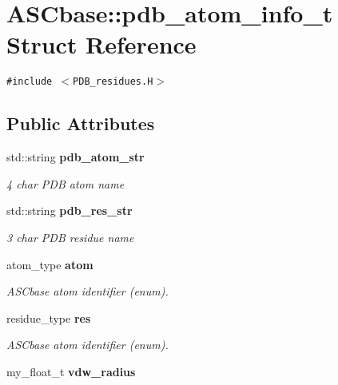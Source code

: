 \section{ASCbase::pdb\_\-atom\_\-info\_\-t Struct Reference}
\label{structASCbase_1_1pdb__atom__info__t}
{\tt \#include $<$PDB\_\-residues.H$>$}

\subsection*{Public Attributes}
\begin{CompactItemize}
\item 
std::string \bf{pdb\_\-atom\_\-str}\label{structASCbase_1_1pdb__atom__info__t_5c36c5c8f4e3e90d5cd92dc4aacb5256}

\begin{CompactList}\small\item\em 4 char PDB atom name \item\end{CompactList}\item 
std::string \bf{pdb\_\-res\_\-str}\label{structASCbase_1_1pdb__atom__info__t_9b3d5dd5a58707f7df56b34ccd3001dd}

\begin{CompactList}\small\item\em 3 char PDB residue name \item\end{CompactList}\item 
atom\_\-type \bf{atom}\label{structASCbase_1_1pdb__atom__info__t_561bfb1b2bef5880d0accf3c7c4563c4}

\begin{CompactList}\small\item\em ASCbase atom identifier (enum). \item\end{CompactList}\item 
residue\_\-type \bf{res}\label{structASCbase_1_1pdb__atom__info__t_85202b305d0450723fd5493b5bbdc1b4}

\begin{CompactList}\small\item\em ASCbase atom identifier (enum). \item\end{CompactList}\item 
my\_\-float\_\-t \bf{vdw\_\-radius}\label{structASCbase_1_1pdb__atom__info__t_0247ef763a73651c46417102552e3c22}


\end{CompactItemize}
